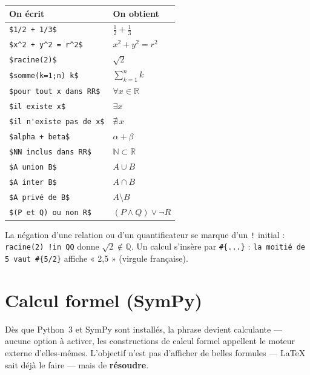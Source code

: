\documentclass[11pt,a4paper]{article}
\newcommand{\bal}[1]{\texttt{#1}}
\begin{document}
\begin{longtable}{@{}ll@{}}
\toprule
\textbf{On écrit} & \textbf{On obtient} \\
\midrule
\verb|$1/2 + 1/3$| & $\tfrac12 + \tfrac13$ \\
\verb|$x^2 + y^2 = r^2$| & $x^2 + y^2 = r^2$ \\
\verb|$racine(2)$| & $\sqrt{2}$ \\
\verb|$somme(k=1;n) k$| & $\sum_{k=1}^{n} k$ \\
\verb|$pour tout x dans RR$| & $\forall x \in \mathbb{R}$ \\
\verb|$il existe x$| & $\exists x$ \\
\verb|$il n'existe pas de x$| & $\nexists\, x$ \\
\verb|$alpha + beta$| & $\alpha + \beta$ \\
\verb|$NN inclus dans RR$| & $\mathbb{N} \subset \mathbb{R}$ \\
\verb|$A union B$| & $A \cup B$ \\
\verb|$A inter B$| & $A \cap B$ \\
\verb|$A privé de B$| & $A \setminus B$ \\
\verb|$(P et Q) ou non R$| & $(P \land Q) \lor \lnot R$ \\
\bottomrule
\end{longtable}

La négation d'une relation ou d'un quantificateur se marque d'un \bal{!}
initial : \bal{racine(2) !in QQ} donne $\sqrt2 \notin \mathbb{Q}$. Un
calcul s'insère par \bal{\#\{...\}} : \bal{la moitié de 5 vaut
\#\{5/2\}} affiche « 2,5 » (virgule française).

\section{Calcul formel (SymPy)}

Dès que Python~3 et SymPy sont installés, la phrase devient
calculante --- aucune option à activer, les constructions de calcul
formel appellent le moteur externe d'elles-mêmes. L'objectif
n'est pas d'afficher de belles formules --- LaTeX sait déjà le faire ---
mais de \textbf{résoudre}.
\end{document}
